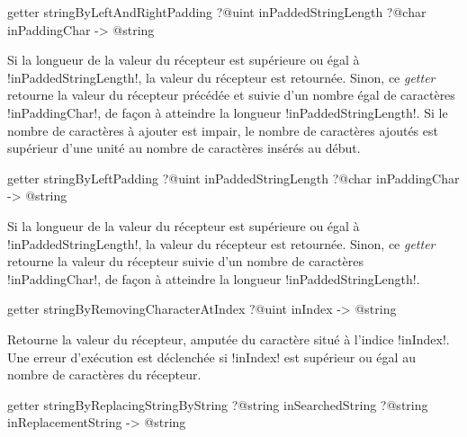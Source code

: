 \begin{galgasbox}
getter stringByLeftAndRightPadding
   ?@uint inPaddedStringLength
   ?@char inPaddingChar -> @string
\end{galgasbox}

Si la longueur de la valeur du récepteur est supérieure ou égal à \ggs!inPaddedStringLength!, la valeur du récepteur est retournée. Sinon, ce \emph{getter} retourne la valeur du récepteur précédée et suivie d'un nombre égal de caractères \ggs!inPaddingChar!, de façon à atteindre la longueur \ggs!inPaddedStringLength!. Si le nombre de caractères à ajouter est impair, le nombre de caractères ajoutés est supérieur d'une unité au nombre de caractères insérés au début.









\begin{galgasbox}
getter stringByLeftPadding
   ?@uint inPaddedStringLength
   ?@char inPaddingChar -> @string
\end{galgasbox}

Si la longueur de la valeur du récepteur est supérieure ou égal à \ggs!inPaddedStringLength!, la valeur du récepteur est retournée. Sinon, ce \emph{getter} retourne la valeur du récepteur suivie d'un nombre de caractères \ggs!inPaddingChar!, de façon à atteindre la longueur \ggs!inPaddedStringLength!.








\begin{galgasbox}
getter stringByRemovingCharacterAtIndex ?@uint inIndex -> @string
\end{galgasbox}

Retourne la valeur du récepteur, amputée du caractère situé à l'indice \ggs!inIndex!. Une erreur d'exécution est déclenchée si \ggs!inIndex! est supérieur ou égal au nombre de caractères du récepteur.








\begin{galgasbox}
getter stringByReplacingStringByString
     ?@string inSearchedString
     ?@string inReplacementString  -> @string
\end{galgasbox}

